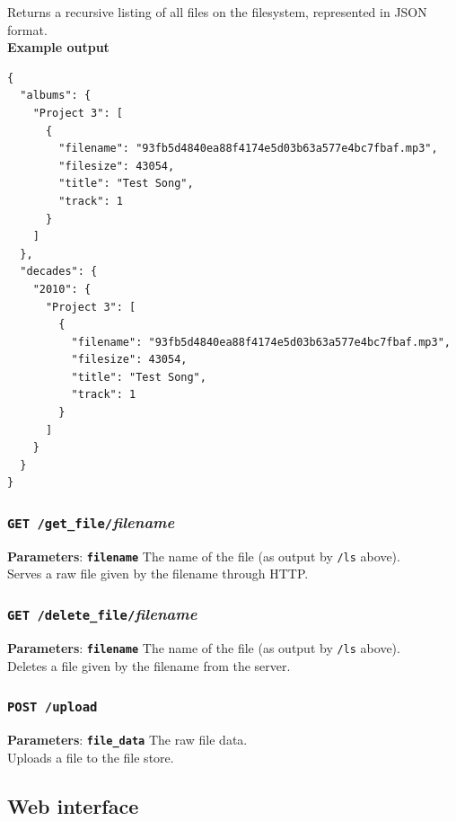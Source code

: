 \documentclass{article}
\begin{document}
	\noindent Returns a recursive listing of all files on the filesystem, represented in JSON format. \\

	\noindent\textbf{Example output}
\begin{lstlisting}
{
  "albums": {
    "Project 3": [
      {
        "filename": "93fb5d4840ea88f4174e5d03b63a577e4bc7fbaf.mp3",
        "filesize": 43054,
        "title": "Test Song",
        "track": 1
      }
    ]
  },
  "decades": {
    "2010": {
      "Project 3": [
        {
          "filename": "93fb5d4840ea88f4174e5d03b63a577e4bc7fbaf.mp3",
          "filesize": 43054,
          "title": "Test Song",
          "track": 1
        }
      ]
    }
  }
}
\end{lstlisting}
	
	\subsubsection{\texttt{GET /get\_file/}\textit{filename}}
	\textbf{Parameters}: \textbf{\texttt{filename}} The name of the file (as output by \texttt{/ls} above). \\
	
	\noindent Serves a raw file given by the filename through HTTP.
	
	\subsubsection{\texttt{GET /delete\_file/}\textit{filename}}
	\textbf{Parameters}: \textbf{\texttt{filename}} The name of the file (as output by \texttt{/ls} above). \\
	
	\noindent Deletes a file given by the filename from the server.
	
	\subsubsection{\texttt{POST /upload}}
	\textbf{Parameters}: \textbf{\texttt{file\_data}} The raw file data. \\
	
	\noindent Uploads a file to the file store.
	
	\subsection{Web interface}
	 
\end{document}
